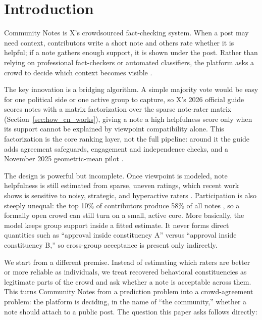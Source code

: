 \documentclass[10pt,twocolumn]{article}
\begin{document}
\section{Introduction}

Community Notes is X's crowdsourced fact-checking system. When a post may need
context, contributors write a short note and others rate whether it is helpful;
if a note gathers enough support, it is shown under the post. Rather than relying
on professional fact-checkers or automated classifiers, the platform asks a crowd
to decide which context becomes visible
\citep{wojcik2022birdwatch,xcommunitynotes2026ranking}.

The key innovation is a bridging algorithm. A simple majority vote would be easy
for one political side or one active group to capture, so X's 2026 official guide
scores notes with a matrix factorization over the sparse note-rater matrix
(Section~\ref{sec:how_cn_works}), giving a note a high helpfulness score only when
its support cannot be explained by viewpoint compatibility alone. This
factorization is the core ranking layer, not the full pipeline: around it the
guide adds agreement safeguards, engagement and independence checks, and a
November 2025 geometric-mean pilot \citep{xcommunitynotes2026ranking}.

The design is powerful but incomplete. Once viewpoint is modeled, note
helpfulness is still estimated from sparse, uneven ratings, which recent work
shows is sensitive to noisy, strategic, and hyperactive raters
\citep{goyal2026qsmf,nudo2026hyperactive}. Participation is also steeply unequal:
the top 10\% of contributors produce 58\% of all notes
\citep{razuvayevskaya2025timeliness}, so a formally open crowd can still turn on a
small, active core. More basically, the model keeps group support inside a fitted
estimate. It never forms direct quantities such as ``approval inside constituency
A'' versus ``approval inside constituency B,'' so cross-group acceptance is
present only indirectly.

We start from a different premise. Instead of estimating which raters are better
or more reliable as individuals, we treat recovered behavioral constituencies as
legitimate parts of the crowd and ask whether a note is acceptable across them.
This turns Community Notes from a prediction problem into a crowd-agreement
problem: the platform is deciding, in the name of ``the community,'' whether a
note should attach to a public post. The question this paper asks follows
directly:
\end{document}
